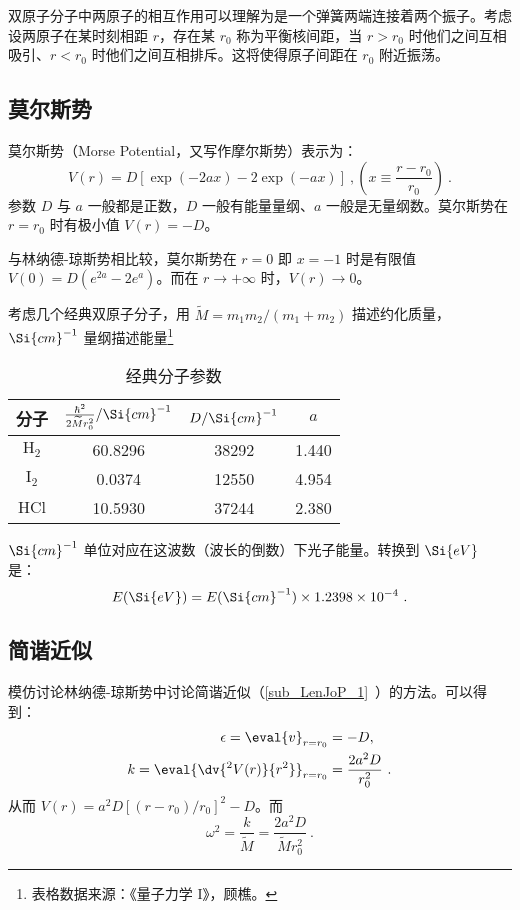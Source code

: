 

双原子分子中两原子的相互作用可以理解为是一个弹簧两端连接着两个振子。考虑设两原子在某时刻相距 $r$，存在某 $r_0$ 称为平衡核间距，当 $r>r_0$ 时他们之间互相吸引、$r<r_0$ 时他们之间互相排斥。这将使得原子间距在 $r_0$ 附近振荡。

\subsection{莫尔斯势}
莫尔斯势（Morse Potential，又写作摩尔斯势）表示为：
\begin{equation}
V(r) = D [\exp(-2ax) - 2\exp(-ax)] \ , \left(x \equiv \frac{r-r_0}{r_0}\right)~.
\end{equation}
参数 $D$ 与 $a$ 一般都是正数，$D$ 一般有能量量纲、$a$ 一般是无量纲数。莫尔斯势在 $r=r_0$ 时有极小值 $V(r)=-D$。

与林纳德-琼斯势相比较，莫尔斯势在 $r = 0$ 即 $x = -1$ 时是有限值 $V(0) = D(e^{2a}-2e^{a})$。而在 $r \rightarrow +\infty$ 时，$V(r) \rightarrow 0$。

考虑几个经典双原子分子，用 $\widetilde{M} = m_1m_2/(m_1+m_2)$ 描述约化质量，$\Si{cm}^{-1}$ 量纲描述能量\footnote{表格数据来源：《量子力学 I》，顾樵。}
\begin{table}[ht]
\centering
\caption{经典分子参数}\label{tab_MoPoQM1}
\begin{tabular}{|c|c|c|c|}
\hline
分子 & $\frac{\hbar^2}{2 \widetilde{M} r_0^2}/\Si{cm}^{-1}$ & $D/\Si{cm}^{-1}$ & $a$ \\
\hline
$\text{H}_2$ & 60.8296 & 38292 & 1.440 \\
\hline
$\text{I}_2$ & 0.0374 & 12550 & 4.954 \\
\hline
$\text{HCl}$ & 10.5930 & 37244 & 2.380 \\
\hline
\end{tabular}
\end{table}
$\Si{cm}^{-1}$ 单位对应在这波数（波长的倒数）下光子能量。转换到 $\Si{eV}$ 是：
$$E(\Si{eV}) = E(\Si{cm}^{-1}) \times 1.2398 \times 10^{-4} ~.$$

\subsection{简谐近似}
模仿讨论林纳德-琼斯势中讨论简谐近似（\autoref{sub_LenJoP_1}~）的方法。可以得到：
\begin{equation}
\begin{aligned}
\epsilon = \eval{v}_{r = r_0}& = -D ,\\
k = \eval{\dv{^2 V(r)}{r^2}}_{r = r_0}& = \frac{2a^2 D}{r_0^2} ~.
\end{aligned}
\end{equation}
从而 $V(r) = a^2 D[(r-r_0)/r_0]^2 - D$。而 
$$\omega^2 = \frac{k}{\widetilde M} = \frac{2a^2D}{\widetilde Mr_0^2} ~.$$

